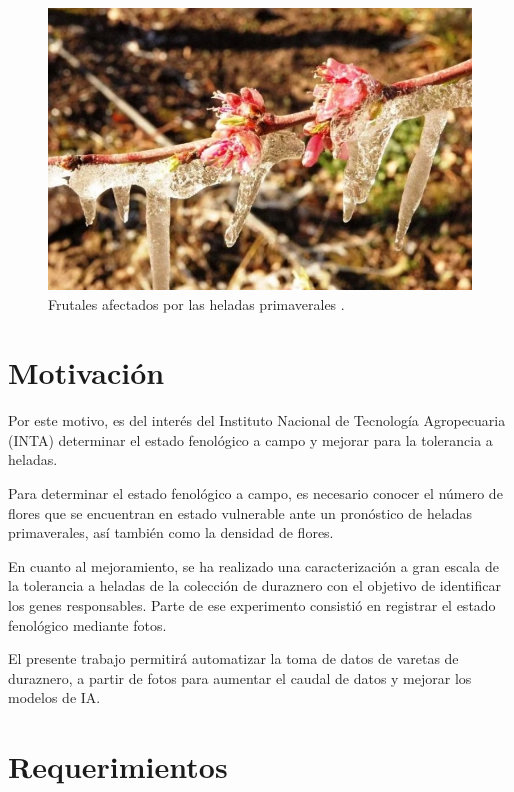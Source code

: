 \begin{figure}[htpb]
	\centering
	\includegraphics[scale=.4]{./Figures/heladas3.jpeg}
	\caption{Frutales afectados por las heladas primaverales \cite{WEBSITE:1}.}
	\label{fig:helada}
\end{figure}

\section{Motivación}

Por este motivo, es del interés del Instituto Nacional de Tecnología Agropecuaria (INTA) determinar el estado fenológico a campo y mejorar para la tolerancia a heladas.

Para determinar el estado fenológico a campo, es necesario conocer el número de flores que se encuentran en estado vulnerable ante un pronóstico de heladas primaverales, así también como la densidad de flores.

En cuanto al mejoramiento, se ha realizado una caracterización a gran escala de la tolerancia a heladas de la colección de duraznero con el objetivo de identificar los genes responsables. Parte de ese experimento consistió en registrar el estado fenológico mediante fotos.

El presente trabajo permitirá automatizar la toma de datos de varetas de duraznero, a partir de fotos para aumentar el caudal de datos y mejorar los modelos de IA.

\section{Requerimientos}

